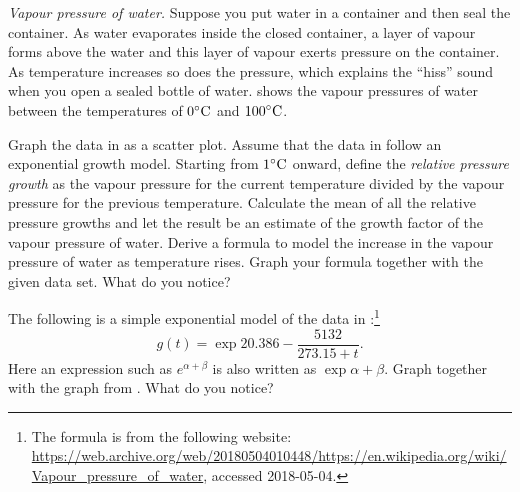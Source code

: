 \documentclass[a4paper,oneside,12pt]{article}
\begin{document}
\begin{problem}
\item\emph{Vapour pressure of water.}
  Suppose you put water in a container and then seal the container.
  As water evaporates inside the closed container, a layer of vapour
  forms above the water and this layer of vapour exerts pressure on
  the container.  As temperature increases so does the pressure, which
  explains the ``hiss'' sound when you open a sealed bottle of water.
   shows the vapour pressures of
  water between the temperatures of ${0}^{\circ}\textrm{C}$ and
  ${100}^{\circ}\textrm{C}$.
  \begin{packedenum}
  \item\label{subprob:water_mean_growth_factor}
    Graph the data in  as a scatter
    plot.  Assume that the data in 
    follow an exponential growth model.  Starting from ${1}^{\circ}\textrm{C}$
    onward, define the \emph{relative pressure growth} as the vapour
    pressure for the current temperature divided by the vapour
    pressure for the previous temperature.  Calculate the mean of all
    the relative pressure growths and let the result be an estimate of
    the growth factor of the vapour pressure of water.  Derive a
    formula to model the increase in the vapour pressure of water as
    temperature rises.  Graph your formula together with the given
    data set.  What do you notice?

  \item\label{subprob:water_Wikipedia_formula}
    The following is a simple exponential model of the data in
    :\footnote{
      The formula is from the following website:
      \url{https://web.archive.org/web/20180504010448/https://en.wikipedia.org/wiki/Vapour_pressure_of_water},
      accessed 2018-05-04.
    }
    \begin{equation}
    \label{eqn:vapour_pressure_Wikipedia_formula}
    g(t)
    =
    \exp{
      20.386
      -
      \frac{5132}{273.15 + t}
    }.
    \end{equation}
    Here an expression such as $e^{\alpha + \beta}$ is also written as
    $\exp{\alpha + \beta}$.  Graph
     together with the
    graph from .  What do you
    notice?


\end{packedenum}
\end{problem}
\end{document}
